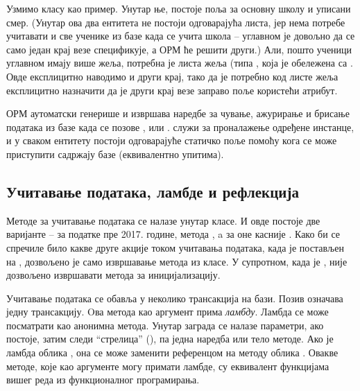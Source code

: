 Узмимо класу  као пример. Унутар ње, постоје  поља за основну школу и уписани смер. (Унутар ова два ентитета не постоји одговарајућа листа, јер нема потребе учитавати и све ученике из базе када се учита школа -- углавном је довољно да се само један крај везе спецификује, а ОРМ ће решити други.) Али, пошто ученици углавном имају више жеља, потребна је листа жеља (типа , која је обележена са . Овде експлицитно наводимо и други крај, тако да је потребно код листе жеља експлицитно назначити да је други крај везе заправо поље  користећи  атрибут.

ОРМ аутоматски генерише и извршава наредбе за чување, ажурирање и брисање података из базе када се позове ,  или .  служи за проналажење одређене инстанце, и у сваком ентитету постоји одговарајуће статичко поље  помоћу кога се може приступити садржају базе (еквивалентно  упитима).

\subsection{Учитавање података, ламбде и рефлекција}\label{subs:refl}

Методе за учитавање података се налазе унутар  класе. И овде постоје две варијанте -- за податке пре 2017. године, метода , a за оне касније . Како би се спречиле било какве друге акције током учитавања података, када је  постављен на , дозвољено је само извршавање метода из  класе. У супротном, када је   , није дозвољено извршавати метода за иницијализацију.

Учитавање података се обавља у неколико трансакција на бази. Позив  означава једну трансакцију. Oва метода као аргумент прима \emph{ламбду}. Ламбда се може посматрати као анонимна метода. Унутар заграда се налазе параметри, ако постоје, затим следи \enquote{стрелица} (\code{->}), па једна наредба или тело методе. Ако је ламбда облика , она се може заменити референцом на методу облика . Овакве методе, које као аргументе могу примати ламбде, су еквивалент функцијама вишег реда из функционалног програмирања.

